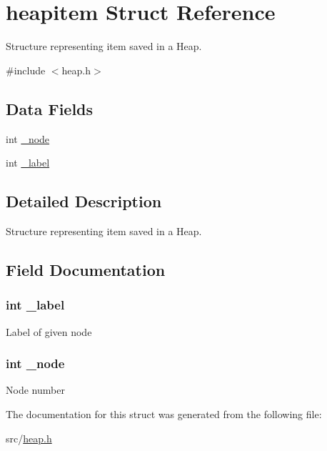 \hypertarget{structheapitem}{\section{heapitem Struct Reference}
\label{structheapitem}
}


Structure representing item saved in a Heap.  




{\ttfamily \#include $<$heap.\-h$>$}

\subsection*{Data Fields}
\begin{DoxyCompactItemize}
\item 
int \hyperlink{structheapitem_a67faa97c036fbdaafcbb4e09138da278}{\-\_\-node}
\item 
int \hyperlink{structheapitem_a1fbd5fae6915678de052c0194d07f3cf}{\-\_\-label}
\end{DoxyCompactItemize}


\subsection{Detailed Description}
Structure representing item saved in a Heap. 

\subsection{Field Documentation}
\hypertarget{structheapitem_a1fbd5fae6915678de052c0194d07f3cf}{
\subsubsection[{\-\_\-label}]{\setlength{\rightskip}{0pt plus 5cm}int {\bf \-\_\-label}}}\label{structheapitem_a1fbd5fae6915678de052c0194d07f3cf}
Label of given node \hypertarget{structheapitem_a67faa97c036fbdaafcbb4e09138da278}{
\subsubsection[{\-\_\-node}]{\setlength{\rightskip}{0pt plus 5cm}int {\bf \-\_\-node}}}\label{structheapitem_a67faa97c036fbdaafcbb4e09138da278}
Node number 

The documentation for this struct was generated from the following file\-:\begin{DoxyCompactItemize}
\item 
src/\hyperlink{heap_8h}{heap.\-h}\end{DoxyCompactItemize}
